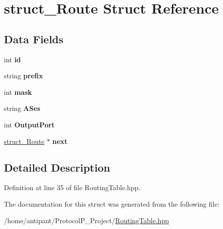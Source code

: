 \hypertarget{structstruct__Route}{\section{struct\-\_\-\-Route Struct Reference}
\label{structstruct__Route}
}
\subsection*{Data Fields}
\begin{DoxyCompactItemize}
\item 
\hypertarget{structstruct__Route_a3dff90ab63fcc429ca80a3ef8ef3ad48}{int {\bfseries id}}\label{structstruct__Route_a3dff90ab63fcc429ca80a3ef8ef3ad48}

\item 
\hypertarget{structstruct__Route_aa37611b878f02a5b6dd235010dff0656}{string {\bfseries prefix}}\label{structstruct__Route_aa37611b878f02a5b6dd235010dff0656}

\item 
\hypertarget{structstruct__Route_a686f4a523cc70a19ba1725676b7a281e}{int {\bfseries mask}}\label{structstruct__Route_a686f4a523cc70a19ba1725676b7a281e}

\item 
\hypertarget{structstruct__Route_aa701995db61b15b8218cd649a2e1f062}{string {\bfseries A\-Ses}}\label{structstruct__Route_aa701995db61b15b8218cd649a2e1f062}

\item 
\hypertarget{structstruct__Route_a45a03fa95a6c99b6c232befd759effce}{int {\bfseries Output\-Port}}\label{structstruct__Route_a45a03fa95a6c99b6c232befd759effce}

\item 
\hypertarget{structstruct__Route_ab3531db9abe6c0ca498ed592919c0cc7}{\hyperlink{structstruct__Route}{struct\-\_\-\-Route} $\ast$ {\bfseries next}}\label{structstruct__Route_ab3531db9abe6c0ca498ed592919c0cc7}

\end{DoxyCompactItemize}


\subsection{Detailed Description}


Definition at line 35 of file Routing\-Table.\-hpp.



The documentation for this struct was generated from the following file\-:\begin{DoxyCompactItemize}
\item 
/home/antipant/\-Protocol\-P\-\_\-\-Project/\hyperlink{RoutingTable_8hpp}{Routing\-Table.\-hpp}\end{DoxyCompactItemize}
